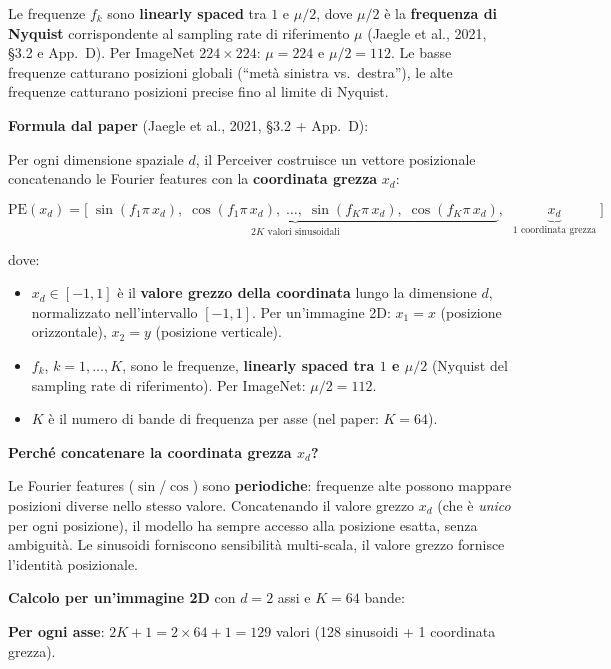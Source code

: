 \documentclass[
  11pt,
]{article}
\begin{document}
Le frequenze $f_k$ sono \textbf{linearly spaced} tra $1$ e $\mu/2$, dove $\mu/2$ è la \textbf{frequenza di Nyquist} corrispondente al sampling rate di riferimento $\mu$ (Jaegle et al., 2021, \S3.2 e App.\ D). Per ImageNet $224 \times 224$: $\mu = 224$ e $\mu/2 = 112$. Le basse frequenze catturano posizioni globali (``metà sinistra vs.\ destra''), le alte frequenze catturano posizioni precise fino al limite di Nyquist.

\begin{formulabox}[title={\textbf{Calcolo di $C$: perché 261 e non 3}}]

\textbf{Formula dal paper} (Jaegle et al., 2021, \S3.2 + App.\ D):

Per ogni dimensione spaziale $d$, il Perceiver costruisce un vettore posizionale concatenando le Fourier features con la \textbf{coordinata grezza} $x_d$:

\[
\text{PE}(x_d) = \Big[\; \underbrace{\sin(f_1 \pi\, x_d),\; \cos(f_1 \pi\, x_d),\; \ldots,\; \sin(f_K \pi\, x_d),\; \cos(f_K \pi\, x_d)}_{2K \text{ valori sinusoidali}},\;\; \underbrace{x_d}_{1 \text{ coordinata grezza}} \;\Big]
\]

dove:
\begin{itemize}
\item $x_d \in [-1, 1]$ è il \textbf{valore grezzo della coordinata} lungo la dimensione $d$, normalizzato nell'intervallo $[-1,1]$. Per un'immagine 2D: $x_1 = x$ (posizione orizzontale), $x_2 = y$ (posizione verticale).
\item $f_k$, $k = 1, \ldots, K$, sono le frequenze, \textbf{linearly spaced tra $1$ e $\mu/2$} (Nyquist del sampling rate di riferimento). Per ImageNet: $\mu/2 = 112$.
\item $K$ è il numero di bande di frequenza per asse (nel paper: $K = 64$).
\end{itemize}

\textbf{Perché concatenare la coordinata grezza $x_d$?}

Le Fourier features ($\sin$/$\cos$) sono \textbf{periodiche}: frequenze alte possono mappare posizioni diverse nello stesso valore. Concatenando il valore grezzo $x_d$ (che è \emph{unico} per ogni posizione), il modello ha sempre accesso alla posizione esatta, senza ambiguità. Le sinusoidi forniscono sensibilità multi-scala, il valore grezzo fornisce l'identità posizionale.

\medskip
\textbf{Calcolo per un'immagine 2D} con $d=2$ assi e $K=64$ bande:

\textbf{Per ogni asse}: $2K + 1 = 2 \times 64 + 1 = 129$ valori (128 sinusoidi + 1 coordinata grezza).


\end{formulabox}
\end{document}
